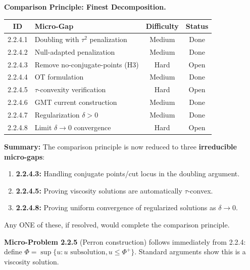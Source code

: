 \begin{center}
\textbf{Comparison Principle: Finest Decomposition.}
\begin{center}
\begin{tabular}{|c|l|c|c|}
\hline
\textbf{ID} & \textbf{Micro-Gap} & \textbf{Difficulty} & \textbf{Status} \\
\hline
2.2.4.1 & Doubling with $\tau^2$ penalization & Medium & Done \\
2.2.4.2 & Null-adapted penalization & Medium & Done \\
2.2.4.3 & Remove no-conjugate-points (H3) & Hard & Open \\
2.2.4.4 & OT formulation & Medium & Done \\
2.2.4.5 & $\tau$-convexity verification & Hard & Open \\
2.2.4.6 & GMT current construction & Medium & Done \\
2.2.4.7 & Regularization $\delta > 0$ & Medium & Done \\
2.2.4.8 & Limit $\delta \to 0$ convergence & Hard & Open \\
\hline
\end{tabular}
\end{center}
\end{center}

\textbf{Summary:} The comparison principle is now reduced to three \textbf{irreducible micro-gaps}:
\begin{enumerate}
    \item \textbf{2.2.4.3:} Handling conjugate points/cut locus in the doubling argument.
    \item \textbf{2.2.4.5:} Proving viscosity solutions are automatically $\tau$-convex.
    \item \textbf{2.2.4.8:} Proving uniform convergence of regularized solutions as $\delta \to 0$.
\end{enumerate}

Any ONE of these, if resolved, would complete the comparison principle.

\begin{remark}
\textbf{Micro-Problem 2.2.5} (Perron construction) follows immediately from 2.2.4: define $\Phi = \sup\{u : u \text{ subsolution}, u \leq \Phi^+\}$. Standard arguments show this is a viscosity solution.
\end{remark}


